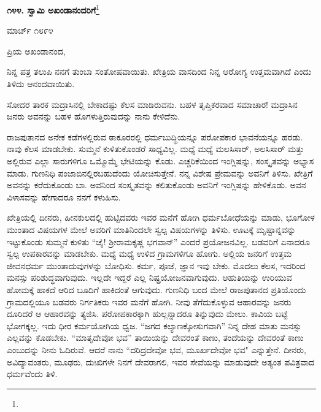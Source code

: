 \begin{center}
\textbf{೧೪೪. ಸ್ವಾಮಿ ಅಖಂಡಾನಂದರಿಗೆ}\footnote{}
\end{center}

\vspace{-0.5cm}

\begin{flushright}
ಮಾರ್ಚ್ ೧೮೯೪
\end{flushright}

\vspace{-0.5cm}

\noindent
ಪ್ರಿಯ ಅಖಂಡಾನಂದ,

ನಿನ್ನ ಪತ್ರ ತಲುಪಿ ನನಗೆ ತುಂಬಾ ಸಂತೋಷವಾಯಿತು. ಖೇತ್ರಿಯ ವಾಸದಿಂದ ನಿನ್ನ ಆರೋಗ್ಯ ಉತ್ತಮವಾಗಿದೆ ಎಂದು ತಿಳಿದು ಆನಂದವಾಯಿತು.

ಸೋದರ ತಾರಕ ಮದ್ರಾಸಿನಲ್ಲಿ ಬೇಕಾದಷ್ಟು ಕೆಲಸ ಮಾಡಿರುವನು. ಬಹಳ ತೃಪ್ತಿಕರವಾದ ಸಮಾಚಾರ! ಮದ್ರಾಸಿನ ಜನರು ಅವನನ್ನು ಬಹಳ ಹೊಗಳುತ್ತಿರುವುದನ್ನು ನಾನು ಕೇಳಿದೆನು.

ರಾಜಪುತಾನದ ಅನೇಕ ಕಡೆಗಳಲ್ಲಿರುವ ಠಾಕೂರರಲ್ಲಿ ಧರ್ಮಬುದ್ಧಿಯನ್ನೂ ಪರೋಪಕಾರ ಭಾವನೆಯನ್ನೂ ಹರಡು. ನಾವು ಕೆಲಸ ಮಾಡಬೇಕು. ಸುಮ್ಮನೆ ಕುಳಿತುಕೊಂಡರೆ ಸಾಧ್ಯವಿಲ್ಲ. ಮಧ್ಯೆ ಮಧ್ಯೆ ಮಲಸಿಸಾರ್, ಅಲಸಿಸಾರ್ ಮತ್ತು ಅಲ್ಲಿರುವ ಎಲ್ಲಾ ಸಾರುಗಳಿಗೂ ಒಮ್ಮೊಮ್ಮೆ ಭೇಟಿಯನ್ನು ಕೊಡು. ಎಚ್ಚರಿಕೆಯಿಂದ ಇಂಗ್ಲಿಷನ್ನು, ಸಂಸ್ಕೃತವನ್ನು ಅಭ್ಯಾಸ ಮಾಡು. ಗುಣನಿಧಿ ಪಂಜಾಬಿನಲ್ಲಿರಬಹುದೆಂದು ಯೋಚಿಸುತ್ತೇನೆ. ನನ್ನ ವಿಶೇಷ ಪ್ರೇಮವನ್ನು ಅವನಿಗೆ ತಿಳಿಸು. ಖೇತ್ರಿಗೆ ಅವನನ್ನು ಕರೆದುಕೊಂಡು ಬಾ. ಅವನಿಂದ ಸಂಸ್ಕೃತವನ್ನು ಕಲಿತುಕೊಂಡು ಅವನಿಗೆ ಇಂಗ್ಲಿಷನ್ನು ಹೇಳಿಕೊಡು. ಅವನ ವಿಳಾಸವನ್ನು ಹೇಗಾದರೂ ನನಗೆ ಕಳುಹಿಸು.

ಖೇತ್ರಿಯಲ್ಲಿ ದೀನರು, ಹೀನಕುಲದಲ್ಲಿ ಹುಟ್ಟಿದವರು ಇವರ ಮನೆಗೆ ಹೋಗಿ ಧರ್ಮಬೋಧೆಯನ್ನು ಮಾಡು, ಭೂಗೋಳ ಮುಂತಾದ ವಿಷಯಗಳ ಮೇಲೆ ಅವರಿಗೆ ಮಾತಿನಿಂದಲೇ ಸ್ವಲ್ಪ ವಿಷಯಗಳನ್ನು ತಿಳಿಸು. ಊಟಕ್ಕೆ ಮೃಷ್ಟಾನ್ನವನ್ನು ಇಟ್ಟುಕೊಂಡು ಸುಮ್ಮನೆ ಕುಳಿತು ``ಜೈ! ಶ‍್ರೀರಾಮಕೃಷ್ಣ ಭಗವಾನ್” ಎಂದರೆ ಪ್ರಯೋಜನವಿಲ್ಲ. ಬಡವರಿಗೆ ಏನಾದರೂ ಸ್ವಲ್ಪ ಉಪಕಾರವನ್ನು ಮಾಡಬೇಕು. ಮಧ್ಯೆ ಮಧ್ಯೆ ಉಳಿದ ಗ್ರಾಮಗಳಿಗೂ ಹೋಗು. ಅಲ್ಲಿಯ ಜನರಿಗೆ ಉತ್ತಮ ಜೀವನಧರ್ಮ ಮುಂತಾದುವುಗಳನ್ನು ಬೋಧಿಸು. ಕರ್ಮ, ಪೂಜೆ, ಜ್ಞಾನ ಇವು ಬೇಕು. ಮೊದಲು ಕೆಲಸ, ಇದರಿಂದ ಮನಸ್ಸು ಪರಿಶುದ್ಧವಾಗುವುದು. ಇಲ್ಲದೇ ಇದ್ದರೆ ಎಲ್ಲ ನಿಷ್ಪ್ರಯೋಜನವಾಗುವುದು. ಆಹುತಿಯನ್ನು ಉರಿಯುವ ಹೋಮಕ್ಕೆ ಹಾಕದೆ ಆರಿದ ಬೂದಿಗೆ ಹಾಕಿದಂತೆ ಆಗುವುದು. ಗುಣನಿಧಿ ಬಂದ ಮೇಲೆ ರಾಜಪುತಾನದ ಪ್ರತಿಯೊಂದು ಗ್ರಾಮದಲ್ಲಿಯೂ ಬಡವರು ನಿರ್ಗತಿಕರು ಇವರ ಮನೆಗೆ ಹೋಗಿ. ನೀವು ತೆಗೆದುಕೊಳ್ಳುವ ಆಹಾರವನ್ನು ಜನರು ದೂರಿದರೆ ಆ ಆಹಾರವನ್ನು ತ್ಯಜಿಸಿ. ಪರೋಪಕಾರಕ್ಕಾಗಿ ಹುಲ್ಲನ್ನಾದರೂ ತಿನ್ನುವುದು ಮೇಲು. ಕಾವಿಯ ಬಟ್ಟೆ ಭೋಗಕ್ಕಲ್ಲ. ಇದು ಧೀರ ಕರ್ಮಯೋಗಿಯ ಧ್ವಜ. ``ಜಗದ ಕಲ್ಯಾಣಕ್ಕೋಸುಗವಾಗಿ'' ನಿನ್ನ ದೇಹ ಮಾತು ಮನಸ್ಸು ಎಲ್ಲವನ್ನು ಕೊಡಬೇಕು. ``ಮಾತೃದೇವೋ ಭವ'' ತಾಯಿಯನ್ನು ದೇವರಂತೆ ಕಾಣು, ತಂದೆಯನ್ನು ದೇವರಂತೆ ಕಾಣು ಎಂಬುದನ್ನು ನೀನು ಓದಿರುವೆ. ಆದರೆ ನಾನು ``ದರಿದ್ರದೇವೋ ಭವ, ಮೂರ್ಖದೇವೋ ಭವ" ಎನ್ನುತ್ತೇನೆ. ದೀನರು, ಅವಿದ್ಯಾವಂತರು, ಮೂಢರು, ದುಃಖಿಗಳೇ ನಿನಗೆ ದೇವರಾಗಲಿ, ಇವರ ಸೇವೆಯನ್ನು ಮಾಡುವುದೇ ಅತ್ಯಂತ ಪವಿತ್ರವಾದ ಧರ್ಮವೆಂದು ತಿಳಿ.

